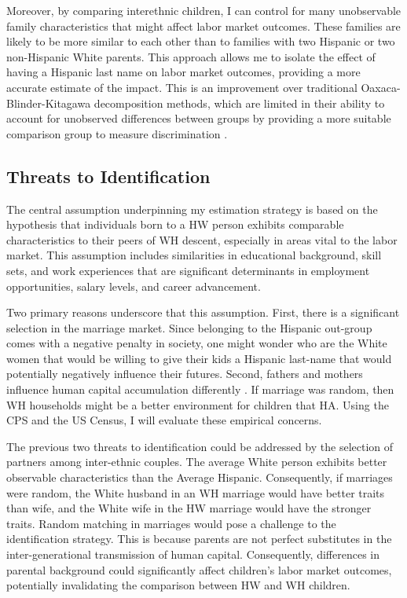 Moreover, by comparing interethnic children, I can control for many unobservable family characteristics that might affect labor market outcomes. These families are likely to be more similar to each other than to families with two Hispanic or two non-Hispanic White parents. This approach allows me to isolate the effect of having a Hispanic last name on labor market outcomes, providing a more accurate estimate of the impact. This is an improvement over traditional Oaxaca-Blinder-Kitagawa decomposition methods, which are limited in their ability to account for unobserved differences between groups by providing a more suitable comparison group to measure discrimination \autocite{oaxaca1973male,blinder1973wage,kitagawa1955components}.

\subsection{Threats to Identification}

The central assumption underpinning my estimation strategy is based on the hypothesis that individuals born to a HW person exhibits comparable characteristics to their peers of WH descent, especially in areas vital to the labor market. This assumption includes similarities in educational background, skill sets, and work experiences that are significant determinants in employment opportunities, salary levels, and career advancement. 

Two primary reasons underscore that this assumption. First, there is a significant selection in the marriage market. Since belonging to the Hispanic out-group comes with a negative penalty in society, one might wonder who are the White women that would be willing to give their kids a Hispanic last-name that would potentially negatively influence their futures. Second, fathers and mothers influence human capital accumulation differently \autocite{kimball2009risk,magruder2010intergenerational}. If marriage was random, then WH households might be a better environment for children that HA. Using the CPS and the US Census, I will evaluate these empirical concerns. 

The previous two threats to identification could be addressed by the selection of partners among inter-ethnic couples. The average White person exhibits better observable characteristics than the Average Hispanic. Consequently, if marriages were random, the White husband in an WH marriage would have better traits than wife, and the White wife in the HW marriage would have the stronger traits. Random matching in marriages would pose a challenge to the identification strategy. This is because parents are not perfect substitutes in the inter-generational transmission of human capital. Consequently, differences in parental background could significantly affect children's labor market outcomes, potentially invalidating the comparison between HW and WH children.

